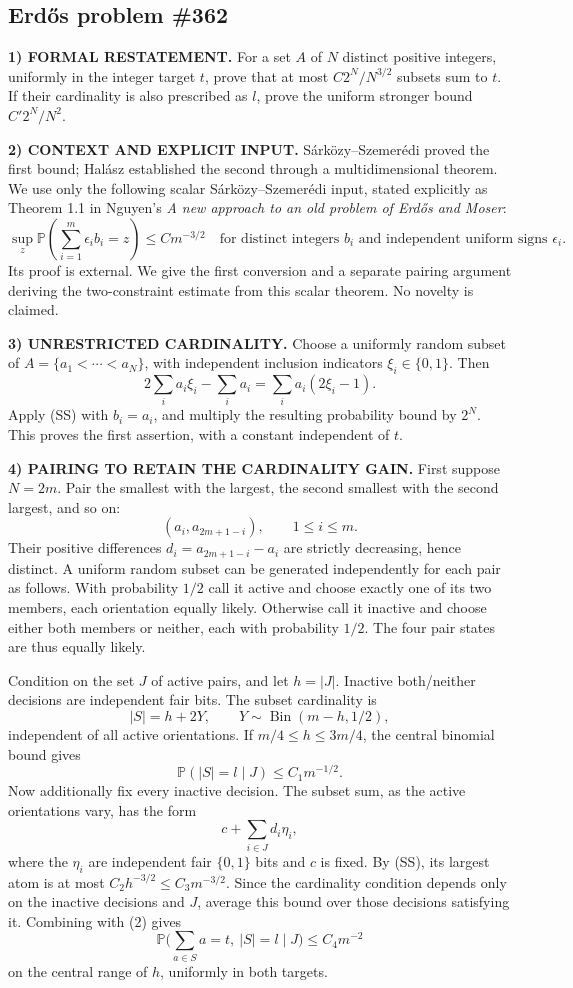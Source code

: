 \subsection*{Erd\H{o}s problem \#362}

\noindent\textbf{1) FORMAL RESTATEMENT.}
For a set $A$ of $N$ distinct positive integers, uniformly in the integer target $t$, prove that at most $C2^N/N^{3/2}$ subsets sum to $t$. If their cardinality is also prescribed as $l$, prove the uniform stronger bound $C'2^N/N^2$.

\noindent\textbf{2) CONTEXT AND EXPLICIT INPUT.}
S\'ark\"ozy--Szemer\'edi proved the first bound; Hal\'asz established the second through a multidimensional theorem. We use only the following scalar S\'ark\"ozy--Szemer\'edi input, stated explicitly as Theorem 1.1 in Nguyen's \emph{A new approach to an old problem of Erd\H{o}s and Moser}:
\[
 \sup_z\mathbb P\left(\sum_{i=1}^m\epsilon_i b_i=z\right)
 \le C m^{-3/2}
 \quad\text{for distinct integers }b_i
 \text{ and independent uniform signs }\epsilon_i. \tag{SS}
\]
Its proof is external. We give the first conversion and a separate pairing argument deriving the two-constraint estimate from this scalar theorem. No novelty is claimed.

\noindent\textbf{3) UNRESTRICTED CARDINALITY.}
Choose a uniformly random subset of $A=\{a_1<\cdots<a_N\}$, with independent inclusion indicators $\xi_i\in\{0,1\}$. Then
\[
 2\sum_i a_i\xi_i-\sum_i a_i
   =\sum_i a_i(2\xi_i-1).
\]
Apply (SS) with $b_i=a_i$, and multiply the resulting probability bound by $2^N$. This proves the first assertion, with a constant independent of $t$.

\noindent\textbf{4) PAIRING TO RETAIN THE CARDINALITY GAIN.}
First suppose $N=2m$. Pair the smallest with the largest, the second smallest with the second largest, and so on:
\[
 (a_i,a_{2m+1-i}),\qquad1\le i\le m.
\]
Their positive differences
$d_i=a_{2m+1-i}-a_i$ are strictly decreasing, hence distinct. A uniform random subset can be generated independently for each pair as follows. With probability $1/2$ call it active and choose exactly one of its two members, each orientation equally likely. Otherwise call it inactive and choose either both members or neither, each with probability $1/2$. The four pair states are thus equally likely.

Condition on the set $J$ of active pairs, and let $h=|J|$. Inactive both/neither decisions are independent fair bits. The subset cardinality is
\[
 |S|=h+2Y,\qquad Y\sim\operatorname{Bin}(m-h,1/2),
\]
independent of all active orientations. If $m/4\le h\le3m/4$, the central binomial bound gives
\[
 \mathbb P(|S|=l\mid J)\le C_1m^{-1/2}. \tag{2}
\]
Now additionally fix every inactive decision. The subset sum, as the active orientations vary, has the form
\[
 c+\sum_{i\in J}d_i\eta_i,
\]
where the $\eta_i$ are independent fair $\{0,1\}$ bits and $c$ is fixed. By (SS), its largest atom is at most $C_2h^{-3/2}\le C_3m^{-3/2}$. Since the cardinality condition depends only on the inactive decisions and $J$, average this bound over those decisions satisfying it. Combining with (2) gives
\[
 \mathbb P\big(\sum_{a\in S}a=t,\ |S|=l\mid J\big)
 \le C_4m^{-2}
\]
on the central range of $h$, uniformly in both targets.

